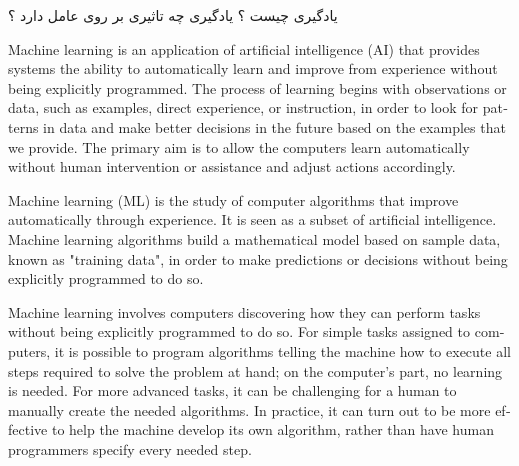 \documentclass[12pt]{article}
\begin{document}
\newpage

\noindent
یادگیری چیست ؟ یادگیری چه تاثیری بر روی عامل دارد ؟

\vspace{10pt}

\begin{latin}
\begin{tcolorbox}
Machine learning is an application of artificial intelligence (AI) that provides systems the ability to automatically learn and improve from experience without being explicitly programmed.
\newline
The process of learning begins with observations or data, such as examples, direct experience, or instruction, in order to look for patterns in data and make better decisions in the future based on the examples that we provide. The primary aim is to allow the computers learn automatically without human intervention or assistance and adjust actions accordingly.
\end{tcolorbox}
\end{latin}



\begin{latin}
\begin{tcolorbox}
Machine learning (ML) is the study of computer algorithms that improve automatically through experience. It is seen as a subset of artificial intelligence. Machine learning algorithms build a mathematical model based on sample data, known as "training data", in order to make predictions or decisions without being explicitly programmed to do so.
\end{tcolorbox}
\end{latin}



\begin{latin}
\begin{tcolorbox}
Machine learning involves computers discovering how they can perform tasks without being explicitly programmed to do so. For simple tasks assigned to computers, it is possible to program algorithms telling the machine how to execute all steps required to solve the problem at hand; on the computer's part, no learning is needed. For more advanced tasks, it can be challenging for a human to manually create the needed algorithms. In practice, it can turn out to be more effective to help the machine develop its own algorithm, rather than have human programmers specify every needed step.
\end{tcolorbox}
\end{latin}
\end{document}
